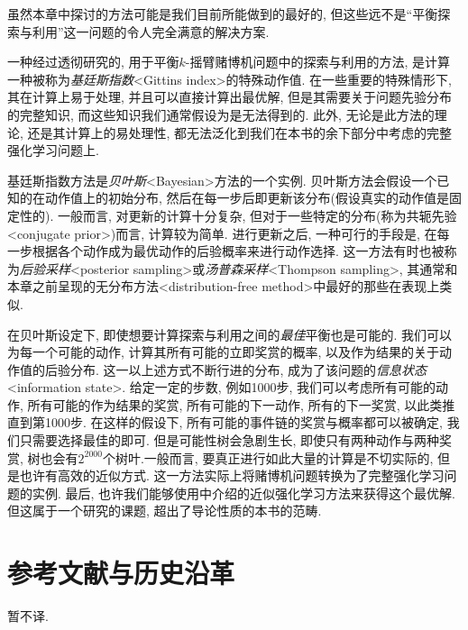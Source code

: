 虽然本章中探讨的方法可能是我们目前所能做到的最好的, 但这些远不是``平衡探索与利用''这一问题的令人完全满意的解决方案.

一种经过透彻研究的, 用于平衡$k$-摇臂赌博机问题中的探索与利用的方法, 是计算一种被称为\emph{基廷斯指数}<Gittins index>的特殊动作值. 在一些重要的特殊情形下,  其在计算上易于处理, 并且可以直接计算出最优解, 但是其需要关于问题先验分布的完整知识, 而这些知识我们通常假设为是无法得到的. 此外, 无论是此方法的理论, 还是其计算上的易处理性, 都无法泛化到我们在本书的余下部分中考虑的完整强化学习问题上.

基廷斯指数方法是\emph{贝叶斯}<Bayesian>方法的一个实例. 贝叶斯方法会假设一个已知的在动作值上的初始分布, 然后在每一步后即更新该分布(假设真实的动作值是固定性的). 一般而言, 对更新的计算十分复杂,  但对于一些特定的分布(称为共轭先验<conjugate prior>)而言, 计算较为简单. 进行更新之后, 一种可行的手段是, 在每一步根据各个动作成为最优动作的后验概率来进行动作选择. 这一方法有时也被称为\emph{后验采样}<posterior sampling>或\emph{汤普森采样}<Thompson sampling>, 其通常和本章之前呈现的无分布方法<distribution-free method>中最好的那些在表现上类似.

在贝叶斯设定下, 即使想要计算探索与利用之间的\emph{最佳}平衡也是可能的. 我们可以为每一个可能的动作, 计算其所有可能的立即奖赏的概率, 以及作为结果的关于动作值的后验分布. 这一以上述方式不断行进的分布, 成为了该问题的\emph{信息状态}<information state>. 给定一定的步数, 例如1000步, 我们可以考虑所有可能的动作, 所有可能的作为结果的奖赏, 所有可能的下一动作, 所有的下一奖赏, 以此类推直到第1000步. 在这样的假设下, 所有可能的事件链的奖赏与概率都可以被确定, 我们只需要选择最佳的即可. 但是可能性树会急剧生长, 即使只有两种动作与两种奖赏, 树也会有$2^{2000}$个树叶.一般而言, 要真正进行如此大量的计算是不切实际的, 但是也许有高效的近似方式. 这一方法实际上将赌博机问题转换为了完整强化学习问题的实例. 最后, 也许我们能够使用中介绍的近似强化学习方法来获得这个最优解. 但这属于一个研究的课题, 超出了导论性质的本书的范畴.

\section{参考文献与历史沿革}

暂不译.